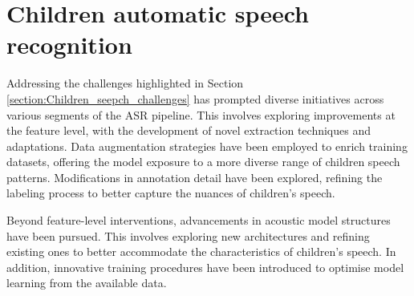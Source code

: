 
\newpage
\section{Children automatic speech recognition} %
Addressing the challenges highlighted in Section \ref{section:Children_seepch_challenges} has prompted diverse initiatives across various segments of the ASR pipeline. This involves exploring improvements at the feature level, with the development of novel extraction techniques and adaptations. Data augmentation strategies have been employed to enrich training datasets, offering the model exposure to a more diverse range of children speech patterns.  Modifications in annotation detail have been explored, refining the labeling process to better capture the nuances of children's speech.

Beyond feature-level interventions, advancements in acoustic model structures have been pursued. This involves exploring new architectures and refining existing ones to better accommodate the characteristics of children's speech. In addition, innovative training procedures have been introduced to optimise model learning from the available data.


